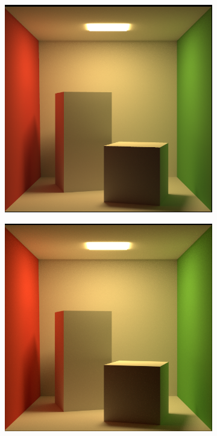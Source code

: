 \documentclass[12pt,a4paper]{article}
\begin{document}
\begin{figure}[h]
\centering
\begin{subfigure}{0.3\textwidth}
\centering
\includegraphics[width=\textwidth]{cornell_box_own.png}
\end{subfigure}
\hspace{0.2cm}
\begin{subfigure}{0.3\textwidth}
\includegraphics[width=\textwidth]{cornell_box_cycles.png}

\end{subfigure}
\end{figure}
\end{document}
